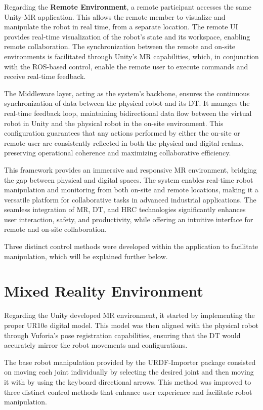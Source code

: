 Regarding the \textbf{Remote Environment}, a remote participant accesses the same Unity-\ac{MR} application. This allows the remote member to visualize and manipulate the robot in real time, from a separate location. The remote \ac{UI} provides real-time visualization of the robot’s state and its workspace, enabling remote collaboration. The synchronization between the remote and on-site environments is facilitated through Unity’s \ac{MR} capabilities, which, in conjunction with the \ac{ROS}-based control, enable the remote user to execute commands and receive real-time feedback.

The Middleware layer, acting as the system’s backbone, ensures the continuous synchronization of data between the physical robot and its \ac{DT}. It manages the real-time feedback loop, maintaining bidirectional data flow between the virtual robot in Unity and the physical robot in the on-site environment. This configuration guarantees that any actions performed by either the on-site or remote user are consistently reflected in both the physical and digital realms, preserving operational coherence and maximizing collaborative efficiency.

This framework provides an immersive and responsive \ac{MR} environment, bridging the gap between physical and digital spaces. The system enables real-time robot manipulation and monitoring from both on-site and remote locations, making it a versatile platform for collaborative tasks in advanced industrial applications. The seamless integration of \ac{MR}, \ac{DT}, and \ac{HRC} technologies significantly enhances user interaction, safety, and productivity, while offering an intuitive interface for remote and on-site collaboration.

Three distinct control methods were developed within the application to facilitate manipulation, which will be explained further below.


\section{Mixed Reality Environment}

Regarding the Unity developed \ac{MR} environment, it started by implementing the proper UR10e digital model. This model was then aligned with the physical robot through Vuforia's pose registration capabilities, ensuring that the \ac{DT} would accurately mirror the robot movements and configurations.

The base robot manipulation provided by the \ac{URDF}-Importer package consisted on moving each joint individually by selecting the desired joint and then moving it with by using the keyboard directional arrows. This method was improved to three distinct control methods that enhance user experience and facilitate robot manipulation.

